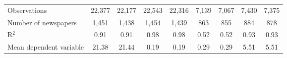 {\begin{tabular}{l*{8}{c}}
\midrule
Observations        &      22,377         &      22,177         &      22,543         &      22,316         &       7,139         &       7,067         &       7,430         &       7,375         \\
Number of newspapers&       1,451         &       1,438         &       1,454         &       1,439         &         863         &         855         &         884         &         878         \\
R$^2$               &        0.91         &        0.91         &        0.98         &        0.98         &        0.52         &        0.52         &        0.93         &        0.93         \\
Mean dependent variable&       21.38         &       21.44         &        0.19         &        0.19         &        0.29         &        0.29         &        5.51         &        5.51         \\
\bottomrule
\end{tabular}
}
